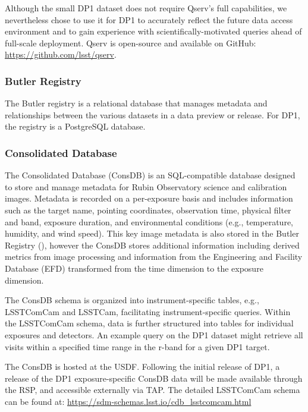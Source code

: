 Although the small DP1 dataset does not require Qserv’s full capabilities, we nevertheless chose to use it for DP1 to accurately reflect the future data access environment and to gain experience with scientifically-motivated queries ahead of full-scale deployment. 
Qserv is open-source and available on GitHub: \url{https://github.com/lsst/qserv}.

\subsubsection{Butler Registry
\label{sssec:butler_registry}} 
The Butler registry is a relational database that manages metadata and relationships between the various datasets in a data preview or release.
For DP1, the registry is a PostgreSQL database. 

\subsubsection{Consolidated Database
\label{sssec:consdb}} 

The Consolidated Database (ConsDB) \citep{dmtn-227} is an SQL-compatible database designed to store and manage metadata for Rubin Observatory science and calibration images. 
Metadata is recorded on a per-exposure basis and includes information such as the target name, pointing coordinates, observation time, physical filter and band, exposure duration, and environmental conditions (e.g., temperature, humidity, and wind speed).
This key image metadata is also stored in the Butler Registry (), however the ConsDB stores additional information  including derived metrics from image processing and information from the Engineering and Facility Database (EFD) transformed from the time dimension to the exposure dimension.

The ConsDB schema is organized into instrument-specific tables, e.g., LSSTComCam and LSSTCam, facilitating instrument-specific queries. 
Within the LSSTComCam schema, data is further structured into tables for individual exposures and detectors.
An example query on the DP1 dataset might retrieve all visits within a specified time range in the r-band for a given DP1 target.

The ConsDB is hosted at the USDF.
Following the initial release of DP1, a release of the DP1 exposure-specific ConsDB data will be made available through the RSP, and accessible externally via TAP.
The detailed LSSTComCam schema can be found at:
\url{https://sdm-schemas.lsst.io/cdb_lsstcomcam.html}